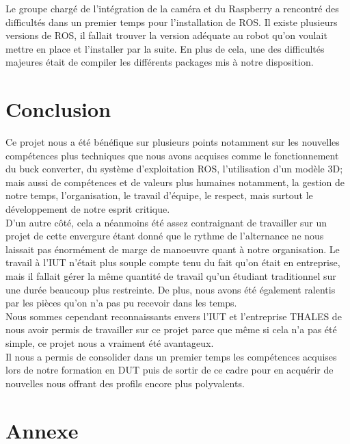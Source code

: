 \documentclass{PackagerQualityN}
\begin{document}
Le groupe chargé de l'intégration de la caméra et du Raspberry a rencontré des difficultés dans un premier temps pour l'installation de ROS. Il existe plusieurs versions de ROS, il fallait trouver la version adéquate au robot qu'on voulait mettre en place et l'installer par la suite.
En plus de cela, une des difficultés majeures était de compiler les différents packages mis à notre disposition.

\newp
\section*{Conclusion}
Ce projet nous a été bénéfique sur plusieurs points notamment sur les nouvelles compétences plus techniques que nous avons acquises comme le fonctionnement du buck converter, du système d'exploitation ROS, l'utilisation d'un modèle 3D; mais aussi de compétences et de valeurs plus humaines notamment, la gestion de notre temps, l'organisation, le travail d'équipe, le respect, mais surtout le développement de notre esprit critique.\\

D'un autre côté, cela a néanmoins été assez contraignant de travailler sur un projet de cette envergure étant donné que le rythme de l'alternance ne nous laissait pas énormément de marge de manoeuvre quant à notre organisation. Le travail à l'IUT n'était plus souple compte tenu du fait qu'on était en entreprise, mais il fallait gérer la même quantité de travail qu'un étudiant traditionnel sur une durée beaucoup plus restreinte.
De plus, nous avons été également ralentis par les pièces qu'on n’a pas pu recevoir dans les temps.\\

Nous sommes cependant reconnaissants envers l'IUT et l'entreprise THALES de nous avoir permis de travailler sur ce projet parce que même si cela n'a pas été simple, ce projet nous a vraiment été avantageux.\\

Il nous a permis de consolider dans un premier temps les compétences acquises lors de notre formation en DUT puis de sortir de ce cadre pour en acquérir de nouvelles nous offrant des profils encore plus polyvalents.


\newp
\section*{Annexe}
\end{document}
